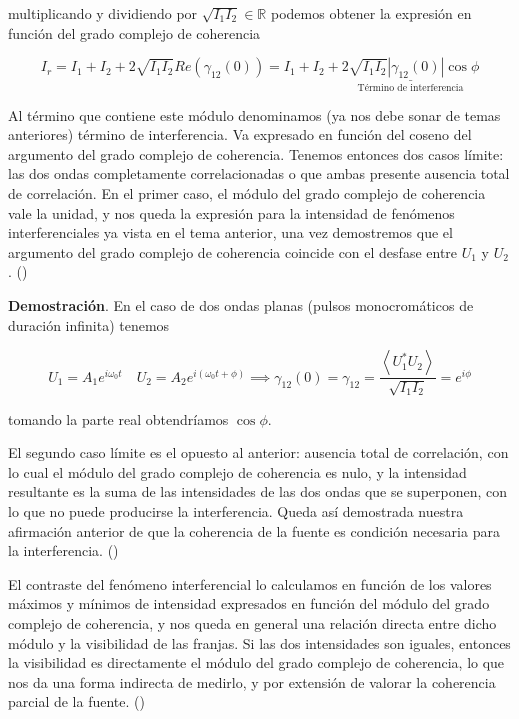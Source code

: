 \documentclass[12pt,a4paper]{report}
\newcommand{\esp}{\vspace{0.5cm}}
\begin{document}
	\noindent multiplicando y dividiendo por $\sqrt{I_1I_2} \in \mathbb{R}$ podemos obtener la expresión en función del grado complejo de coherencia
	
	\begin{equation}
		I_r = I_1 + I_2 +2\sqrt{I_1I_2}Re(\gamma_{12}(0)) = I_1 + I_2 +
		\underset{\text{Término de interferencia}}{\underline{2\sqrt{I_1I_2}|\gamma_{12}(0)|\cos\phi}}
	\end{equation}

	\esp
	
	Al término que contiene este módulo denominamos (ya nos debe sonar de temas anteriores) término de interferencia. Va expresado en función del coseno del argumento del grado complejo de coherencia. Tenemos entonces dos casos límite: las dos ondas completamente correlacionadas o que ambas presente ausencia total de correlación. En el primer caso, el módulo del grado complejo de coherencia vale la unidad, y nos queda la expresión para la intensidad de fenómenos interferenciales ya vista en el tema anterior, una vez demostremos que el argumento del grado complejo de coherencia coincide con el desfase entre $U_1$ y $U_2$. (\cite{Resumen})
	
	\esp
	
	\noindent \textbf{Demostración}. En el caso de dos ondas planas (pulsos monocromáticos de duración infinita) tenemos
	
	\begin{equation}
		U_1 = A_1e^{i\omega_0 t} \quad U_2 = A_2e^{i(\omega_0 t + \phi)} \implies \gamma_{12}(0) = \gamma_{12}=\frac{\left< U^*_1 U_2 \right>}{\sqrt{I_1 I_2}} = e^{i\phi}
	\end{equation}

	\esp

	\noindent tomando la parte real obtendríamos $\cos\phi$.
	
	\esp
	
	El segundo caso límite es el opuesto al anterior: ausencia total de correlación, con lo cual el módulo del grado complejo de coherencia es nulo, y la intensidad resultante es la suma de las intensidades de las dos ondas que se superponen, con lo que no puede producirse la interferencia. Queda así demostrada nuestra afirmación anterior de que la coherencia de la fuente es condición necesaria para la interferencia. (\cite{Resumen})
	
	\esp
	
	El contraste del fenómeno interferencial lo calculamos en función de los valores máximos y mínimos de intensidad expresados en función del módulo del grado complejo de coherencia, y nos queda en general una relación directa entre dicho módulo y la visibilidad de las franjas. Si las dos intensidades son iguales, entonces la visibilidad es directamente el módulo del grado complejo de coherencia, lo que
	nos da una forma indirecta de medirlo, y por extensión de valorar la coherencia parcial de la fuente. (\cite{Resumen})
	
\end{document}
